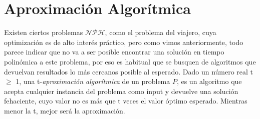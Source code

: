 \documentclass{article}
\begin{document}
\section*{Aproximación Algorítmica}
Existen ciertos problemas $\mathcal{NPH}$, como el problema del viajero, cuya optimización es de alto interés práctico, pero como vimos anteriormente, todo parece indicar que no va a ser posible encontrar una solución en tiempo polinómica a este problema, por eso es habitual que se busquen de algoritmos que devuelvan resultados lo más cercanos posible al esperado.\newline
Dado un número real t $\geq$ 1, una t-\textit{aproximación algorítmica} de un problema $P$, es un algoritmo que acepta cualquier instancia del problema como input y devuelve una solución fehaciente, cuyo valor no es más que t veces el valor óptimo esperado. Mientras menor la t, mejor será la aproximación.
\end{document}
